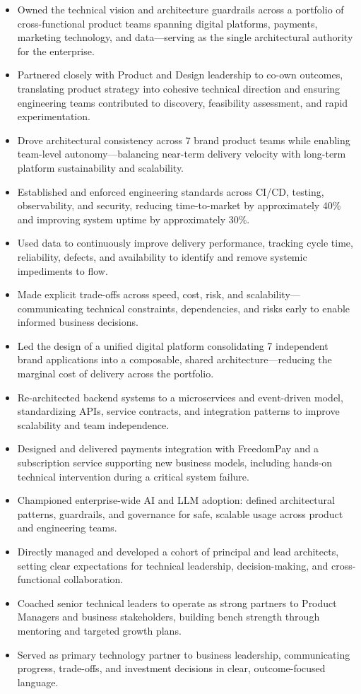 \documentclass[11pt]{article}
\begin{document}
\begin{itemize}
  \item Owned the technical vision and architecture guardrails across a portfolio of cross-functional product teams spanning digital platforms, payments, marketing technology, and data---serving as the single architectural authority for the enterprise.
  \item Partnered closely with Product and Design leadership to co-own outcomes, translating product strategy into cohesive technical direction and ensuring engineering teams contributed to discovery, feasibility assessment, and rapid experimentation.
  \item Drove architectural consistency across 7 brand product teams while enabling team-level autonomy---balancing near-term delivery velocity with long-term platform sustainability and scalability.
  \item Established and enforced engineering standards across CI/CD, testing, observability, and security, reducing time-to-market by approximately 40\% and improving system uptime by approximately 30\%.
  \item Used data to continuously improve delivery performance, tracking cycle time, reliability, defects, and availability to identify and remove systemic impediments to flow.
  \item Made explicit trade-offs across speed, cost, risk, and scalability---communicating technical constraints, dependencies, and risks early to enable informed business decisions.
  \item Led the design of a unified digital platform consolidating 7 independent brand applications into a composable, shared architecture---reducing the marginal cost of delivery across the portfolio.
  \item Re-architected backend systems to a microservices and event-driven model, standardizing APIs, service contracts, and integration patterns to improve scalability and team independence.
  \item Designed and delivered payments integration with FreedomPay and a subscription service supporting new business models, including hands-on technical intervention during a critical system failure.
  \item Championed enterprise-wide AI and LLM adoption: defined architectural patterns, guardrails, and governance for safe, scalable usage across product and engineering teams.
  \item Directly managed and developed a cohort of principal and lead architects, setting clear expectations for technical leadership, decision-making, and cross-functional collaboration.
  \item Coached senior technical leaders to operate as strong partners to Product Managers and business stakeholders, building bench strength through mentoring and targeted growth plans.
  \item Served as primary technology partner to business leadership, communicating progress, trade-offs, and investment decisions in clear, outcome-focused language.
\end{itemize}
\end{document}
